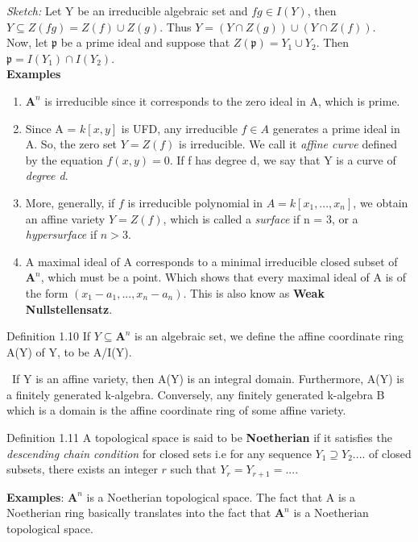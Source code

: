 \documentclass[12pt]{article}
\begin{document}
\textit{Sketch:} Let Y be an irreducible algebraic set and $fg \in I(Y)$, then $Y \subseteq Z(fg) = Z(f) \cup Z(g).$ Thus $Y = (Y \cap Z(g)) \cup (Y\cap Z(f))$.\\
Now, let $\mathfrak{p}$ be a prime ideal and suppose that $Z(\mathfrak{p}) = Y_{1} \cup Y_{2}$.
Then $\mathfrak{p} = I(Y_{1}) \cap I(Y_{2})$.\\
\textbf{Examples}\begin{enumerate}
    \item $\mathbf{A}^n$ is irreducible since it corresponds to the zero ideal in A, which is prime.
    \item Since A = $k[x,y]$ is UFD, any irreducible $f \in A$ generates a prime ideal in A. So, the zero set $Y = Z(f)$ is irreducible. We call it \textit{affine curve } defined by the equation $f(x,y) = 0$. If f has degree d, we say that Y is a curve of \textit{degree d}.
    \item More, generally, if $f$ is irreducible polynomial in $A = k[x_{1},...,x_{n}]$, we obtain an affine variety $Y = Z(f)$, which is called a \textit{surface }if n = 3, or a \textit{hypersurface }if $n >3$.
    \item A maximal ideal of A corresponds to a minimal irreducible closed subset of $\mathbf{A}^n$, which must be a point. Which shows that every maximal ideal of A is of the form $(x_{1} - a_{1},...,x_{n} - a_{n}).$ This is also know as \textbf{Weak Nullstellensatz}.
\end{enumerate}
\begin{definitionBox}{Definition 1.10}
    If $Y \subseteq \mathbf{A}^n$ is an algebraic set, we define the affine coordinate ring A(Y) of Y, to be A/I(Y).
\end{definitionBox}
\begin{remarkBox}
 \   If Y is an affine variety, then A(Y) is an integral domain. Furthermore, A(Y) is a finitely generated k-algebra. Conversely, any finitely generated k-algebra B which is a domain is the affine coordinate ring of some affine variety.
\end{remarkBox}
\begin{definitionBox}{Definition 1.11}
    A topological space is said to be \textbf{Noetherian} if it satisfies the \textit{descending chain condition} for closed sets i.e for any sequence $Y_{1} \supseteq Y_{2} ....$ of closed subsets, there exists an integer $r$ such that $Y_{r} = Y_{r+1} = ...$.
\end{definitionBox}
\textbf{Examples}: $\mathbf{A}^n$ is a Noetherian topological space. The fact that A is a Noetherian ring basically translates into the fact that $\mathbf{A}^n$ is a Noetherian topological space.
\end{document}

